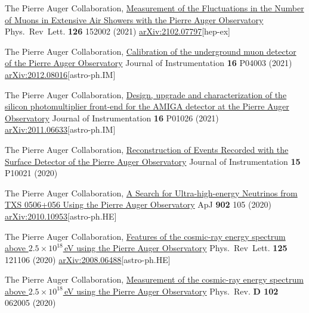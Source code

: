 \begin{etaremune}
\item {} The Pierre Auger Collaboration, \href{https://doi.org/10.1103/PhysRevLett.126.152002}{Measurement of the Fluctuations in the Number of Muons in Extensive Air Showers with the Pierre Auger Observatory} Phys.\ Rev\  Lett. {\textbf{126}} 152002 (2021) \href{https://arxiv.org/abs/2102.07797}{arXiv:2102.07797}[hep-ex]

\item {}The Pierre Auger Collaboration, \href{https://doi.org/10.1088/1748-0221/16/04/P04003}{Calibration of the underground muon detector of the Pierre Auger Observatory} Journal of Instrumentation {\textbf{16}} P04003 (2021) \href{https://arxiv.org/abs/2012.08016}{arXiv:2012.08016}[astro-ph.IM]

\item {}The Pierre Auger Collaboration, \href{https://doi.org/10.1088/1748-0221/16/01/P01026}{Design, upgrade and characterization of the silicon photomultiplier front-end for the AMIGA detector at the Pierre Auger Observatory} Journal of Instrumentation {\textbf{16}} P01026 (2021) \href{ https://arxiv.org/abs/2011.06633}{arXiv:2011.06633}[astro-ph.IM]

\item {}The Pierre Auger Collaboration, \href{https://doi.org/10.1088/1748-0221/15/10/P10021}{Reconstruction of Events Recorded with the Surface Detector of the Pierre Auger Observatory} Journal of Instrumentation {\textbf{15}} P10021 (2020) %

\item {}The Pierre Auger Collaboration, \href{https://doi.org/10.3847/1538-4357/abb476}{A Search for Ultra-high-energy Neutrinos from TXS 0506+056 Using the Pierre Auger Observatory} ApJ {\textbf{902}} 105 (2020) \href{https://arxiv.org/abs/2010.10953}{arXiv:2010.10953}[astro-ph.HE]

\item {}The Pierre Auger Collaboration, \href{https://doi.org/10.1103/PhysRevLett.125.121106}{Features of the cosmic-ray energy spectrum above $2.5\times 10^{18}$\,eV using the Pierre Auger Observatory} Phys.\ Rev\  Lett. {\textbf{125}} 121106 (2020) \href{https://arxiv.org/abs/2008.06488}{arXiv:2008.06488}[astro-ph.HE]

\item {}The Pierre Auger Collaboration, \href{https://doi.org/10.1103/PhysRevD.102.062005}{Measurement of the cosmic-ray energy spectrum above $2.5\times 10^{18}$\,eV using the Pierre Auger Observatory} Phys.\ Rev. {\textbf{D 102}} 062005 (2020) %


\end{etaremune}

